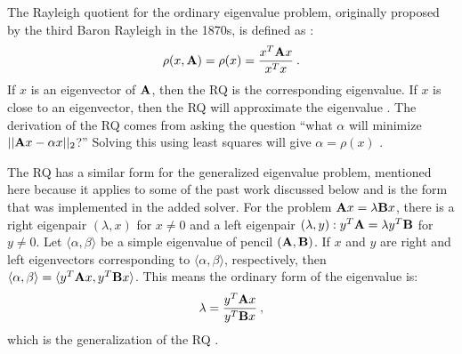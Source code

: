 The Rayleigh quotient for the ordinary eigenvalue problem, originally proposed by the third Baron Rayleigh in the 1870s, is defined as \cite{Parlett1974}:
%
\begin{equation}
  \rho(x, \mathbf{A}) = \rho(x) = \frac{x^{T}\mathbf{A}x}{x^{T}x} \:.
  \label{RQ}
\end{equation}
%
If $x$ is an eigenvector of $\mathbf{A}$, then the RQ is the corresponding eigenvalue. If $x$ is close to an eigenvector, then the RQ will approximate the eigenvalue \cite{Stewart2001}. The derivation of the RQ comes from asking the question ``what $\alpha$ will minimize $||\mathbf{A}x - \alpha x||_2$?'' Solving this using least squares will give $\alpha = \rho(x)$ \cite{Trefethen1997}. 

The RQ has a similar form for the generalized eigenvalue problem, mentioned here because it applies to some of the past work discussed below and is the form that was implemented in the added solver. For the problem $\mathbf{A}x = \lambda \mathbf{B}x$, there is a right eigenpair $(\lambda, x)$ for $x \ne 0$ and a left eigenpair $(\lambda, y): y^{T}\mathbf{A} = \lambda y^{T}\mathbf{B}$ for $y \ne 0$. Let $\langle \alpha, \beta \rangle$ be a simple eigenvalue of pencil $(\mathbf{A}, \mathbf{B})$. If $x$ and $y$ are right and left eigenvectors corresponding to $\langle \alpha, \beta \rangle$, respectively, then $\langle \alpha, \beta \rangle = \langle y^{T} \mathbf{A} x, y^{T} \mathbf{B} x \rangle$. This means the ordinary form of the eigenvalue is:
\begin{equation}
 \lambda = \frac{y^{T} \mathbf{A} x}{y^{T} \mathbf{B} x} \:,
\end{equation}
which is the generalization of the RQ \cite{Stewart2001}. 

